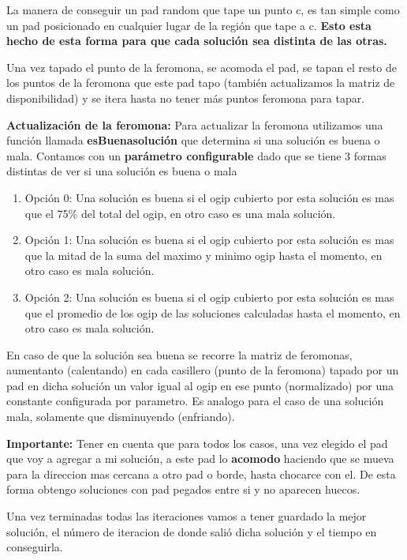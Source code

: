 La manera de conseguir un pad random que tape un punto c, es tan simple como un pad posicionado en cualquier lugar de la regi\'on que tape a c. \textbf{Esto esta hecho de esta forma para que cada soluci\'on sea distinta de las otras.}

Una vez tapado el punto de la feromona, se acomoda el pad, se tapan el resto de los puntos de la feromona que este pad tapo (tambi\'en actualizamos la matriz de disponibilidad) y se itera hasta no tener m\'as puntos feromona para tapar. 

\textbf{Actualizaci\'on de la feromona:} Para actualizar la feromona utilizamos una funci\'on llamada \textbf{esBuenasoluci\'on} que determina si una soluci\'on es buena o mala. Contamos con un \textbf{par\'ametro configurable} dado que se tiene 3 formas distintas de ver si una soluci\'on es buena o mala

\begin{enumerate}
\item Opci\'on 0: Una soluci\'on es buena si el ogip cubierto por esta soluci\'on es mas que el 75\% del total del ogip, en otro caso es una mala soluci\'on.
\item Opci\'on 1: Una soluci\'on es buena si el ogip cubierto por esta soluci\'on es mas que la mitad de la suma del maximo y minimo ogip hasta el momento, en otro caso es mala soluci\'on.
\item Opci\'on 2: Una soluci\'on es buena si el ogip cubierto por esta soluci\'on es mas que el promedio de los ogip de las soluciones calculadas hasta el momento, en otro caso es mala soluci\'on. 
\end{enumerate}

En caso de que la soluci\'on sea buena se recorre la matriz de feromonas, aumentanto (calentando) en cada casillero (punto de la feromona) tapado por un pad en dicha soluci\'on un valor igual al ogip en ese punto (normalizado) por una constante configurada por parametro. Es analogo para el caso de una soluci\'on mala, solamente que disminuyendo (enfriando).


\textbf{Importante:} Tener en cuenta que para todos los casos, una vez elegido el pad que voy a agregar a mi soluci\'on, a este pad lo \textbf{acomodo} haciendo que se mueva para la direccion mas cercana a otro pad o borde, hasta chocarce con el. De esta forma obtengo soluciones con pad pegados entre si y no aparecen huecos.

Una vez terminadas todas las iteraciones vamos a tener guardado la mejor soluci\'on, el n\'umero de iteracion de donde sali\'o dicha soluci\'on y el tiempo en conseguirla.

